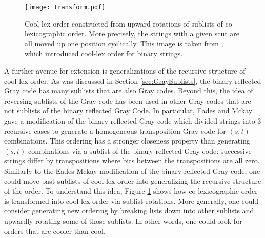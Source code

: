 \begin{figure}
\begin{center}
        \texttt{[image: transform.pdf]}
\end{center}
        \cprotect\caption[Cool-lex order constructed from upward rotations of sublists of co-lexicographic order.]{Cool-lex order constructed from upward rotations of sublists of co-lexicographic order.  More precisely, the strings with a given scut are all moved up one position cyclically.  This image is taken from \cite{ruskey2005generating,ruskey2009coolest}, which introduced cool-lex order for binary strings. }
\label{fig:cooltransform}
\end{figure}

A further avenue for extension is generalizations of the recursive structure of cool-lex order.  As was discussed in Section \ref{sec:GraySublists}, the binary reflected Gray code has many sublists that are also Gray codes.  Beyond this, the idea of reversing sublists of the Gray code has been used in other Gray codes that are not sublists of the binary reflected Gray Code.  In particular, Eades and Mckay gave a modification of the binary reflected Gray code which divided strings into 3 recursive cases to generate a homogeneous transposition Gray code for $(s,t)$-combinations. This ordering has a stronger closeness property than generating $(s,t)$ combinations via a sublist of the binary reflected Gray code: successive strings differ by transpositions where bits between the transpositions are all zero.  Similarly to the Eades-Mckay modification of the binary reflected Gray code, one could move past sublists of cool-lex order into generalizing the recursive structure of the order.  To understand this idea, Figure \ref{fig:cooltransform} shows how co-lexicographic order is transformed into cool-lex order via sublist rotations.  More generally, one could consider generating new ordering by breaking lists down into other sublists and upwardly rotating some of those sublists. In other words, one could look for orders that are cooler than cool. 
